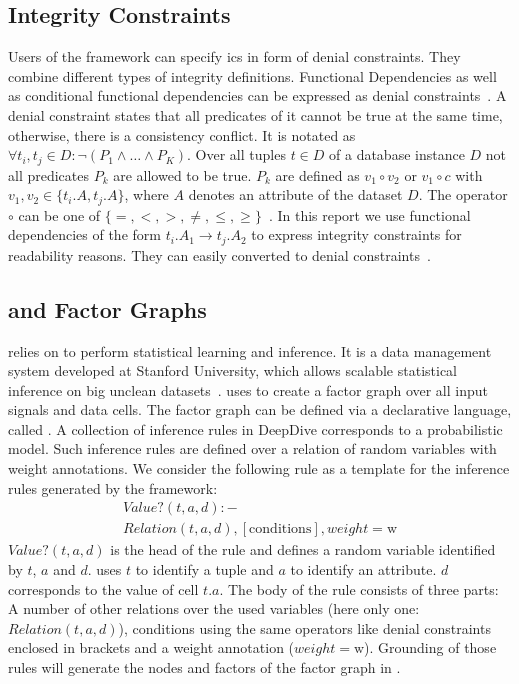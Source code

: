   \subsection{Integrity Constraints}
  Users of the \holoclean{} framework can specify \glspl{ic} in form of denial constraints.
  They combine different types of integrity definitions.
  Functional Dependencies as well as conditional functional dependencies can be expressed as denial constraints~\cite{fd_to_dc}.
  A denial constraint states that all predicates of it cannot be true at the same time, otherwise, there is a consistency conflict.
  It is notated as $\forall t_i, t_j \in D: \neg(P_1 \wedge \dots \wedge P_K)$.
  Over all tuples $t \in D$ of a database instance $D$ not all predicates $P_k$ are allowed to be true.
  $P_k$ are defined as $v_1 \circ v_2$ or $v_1 \circ c$ with $v_1, v_2 \in \{t_i.A, t_j.A\}$, where $A$ denotes an attribute of the dataset $D$.
  The operator $\circ$ can be one of $\{=,<,>,\neq,\leq,\geq\}$~\cite{chu2013discoveringdc}.
  In this report we use functional dependencies of the form $t_i.A_1 \rightarrow t_j.A_2$ to express integrity constraints for readability reasons.
  They can easily converted to denial constraints~\cite{fd_to_dc}.
  
  \subsection{\deepdive{} and Factor Graphs}
  \holoclean{} relies on \deepdive{} to perform statistical learning and inference.
  It is a data management system developed at Stanford University, which allows scalable statistical inference on big unclean datasets~\cite{deepdive}.
  \holoclean{} uses \deepdive{} to create a factor graph over all input signals and data cells.
  The factor graph can be defined via a declarative language, called \ddlog{}.
  A collection of inference rules in DeepDive corresponds to a probabilistic model.
  Such inference rules are defined over a relation of random variables with weight annotations.
  We consider the following \ddlog{} rule as a template for the inference rules generated by the \holoclean{} framework:
  \begin{multline}
    Value?(t,a,d):-\\Relation(t,a,d), [\text{conditions}], weight=\text{w}
  \end{multline}
  $Value?(t,a,d)$ is the head of the rule and defines a random variable identified by $t$, $a$ and $d$.
  \holoclean{} uses $t$ to identify a tuple and $a$ to identify an attribute.
  $d$ corresponds to the value of cell $t.a$.
  The body of the rule consists of three parts:
  A number of other relations over the used variables (here only one: $Relation(t,a,d)$),
  conditions using the same operators like denial constraints enclosed in brackets and
  a weight annotation ($weight=\text{w}$).
  Grounding of those rules will generate the nodes and factors of the factor graph in \deepdive{}.
  

